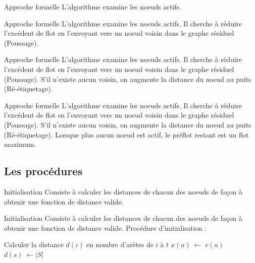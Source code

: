 \documentclass[hyperref={},
xcolor={dvipsnames,svgnames,table},10pt]{beamer}
\begin{document}
\begin{frame}{Approche formelle}
	L'algorithme examine les noeuds actifs.\vfill
\end{frame}

\begin{frame}{Approche formelle}
	L'algorithme examine les noeuds actifs.\vfill
	Il cherche à réduire l'excédent de flot en l'envoyant vers un noeud voisin dans le graphe
	résiduel (Poussage).\vfill
\end{frame}

\begin{frame}{Approche formelle}
	L'algorithme examine les noeuds actifs.\vfill
	Il cherche à réduire l'excédent de flot en l'envoyant vers un noeud voisin dans le graphe
	résiduel (Poussage).\vfill
	S'il n'existe aucun voisin, on augmente la distance du noeud au puits (Ré-étiquetage).\vfill
\end{frame}

\begin{frame}{Approche formelle}
	L'algorithme examine les noeuds actifs.\vfill
	Il cherche à réduire l'excédent de flot en l'envoyant vers un noeud voisin dans le graphe
	résiduel (Poussage).\vfill
	S'il n'existe aucun voisin, on augmente la distance du noeud au puits (Ré-étiquetage).\vfill
	Lorsque plus aucun noeud est actif, le préflot restant est un flot maximum.\vfill
\end{frame}

\subsection{Les procédures}

\begin{frame}{Initialisation}
	Consiste à calculer les distances de chacun des noeuds de façon à obtenir une fonction de distance
	valide.\vfill
\end{frame}

\begin{frame}{Initialisation}
	Consiste à calculer les distances de chacun des noeuds de façon à obtenir une fonction de distance
	valide.\vfill
	Procédure d'initialisation : 
	\begin{algorithmic}[1]
				\STATE Calculer la distance $d(i)$ en nombre d'arêtes de $i$ à $t$  
			\ENDFOR
				\STATE $x(a)\ \leftarrow$ $c(a)$  
			\ENDFOR
			\STATE $d(s)\ \leftarrow |S|$ 
	\end{algorithmic}
\end{frame}
\end{document}
